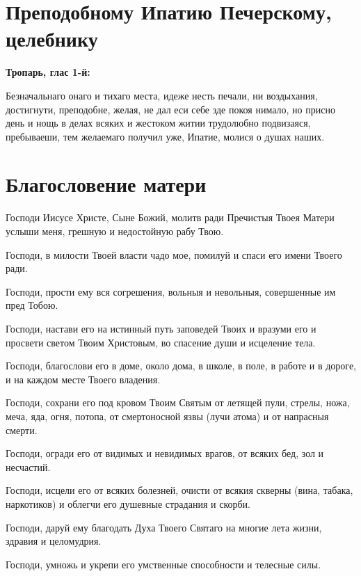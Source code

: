 \section{Преподобному Ипатию Печерскому, целебнику}
 
\bfseries Тропарь, глас 1-й:\normalfont{}


Безначальнаго онаго и тихаго места, идеже несть печали, ни воздыхания, достигнути, преподобне, желая, не дал еси себе зде покоя нимало, но присно день и нощь в делах всяких и жестоком житии трудолюбно подвизаяся, пребываеши, тем желаемаго получил уже, Ипатие, молися о душах наших.


 

\section{Благословение матери}
 


Господи Иисусе Христе, Сыне Божий, молитв ради Пречистыя Твоея Матери услыши меня, грешную и недостойную рабу Твою.

Господи, в милости Твоей власти чадо мое, помилуй и спаси его имени Твоего ради.

Господи, прости ему вся согрешения, вольныя и невольныя, совершенные им пред Тобою.

Господи, настави его на истинный путь заповедей Твоих и вразуми его и просвети светом Твоим Христовым, во спасение души и исцеление тела.

Господи, благослови его в доме, около дома, в школе, в поле, в работе и в дороге, и на каждом месте Твоего владения.

Господи, сохрани его под кровом Твоим Святым от летящей пули, стрелы, ножа, меча, яда, огня, потопа, от смертоносной язвы (лучи атома) и от напрасныя смерти.

Господи, огради его от видимых и невидимых врагов, от всяких бед, зол и несчастий.

Господи, исцели его от всяких болезней, очисти от всякия скверны (вина, табака, наркотиков) и облегчи его душевные страдания и скорби.

Господи, даруй ему благодать Духа Твоего Святаго на многие лета жизни, здравия и целомудрия.

Господи, умножь и укрепи его умственные способности и телесные силы.

